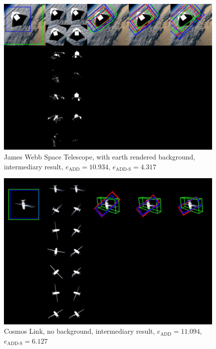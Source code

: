 \begin{figure}[ht]
  \centering
  \includegraphics[width=\textwidth]{data/fig12.jpg}
  \caption{James Webb Space Telescope, with earth rendered background, intermediary result, $e_\mathrm{ADD}=10.934$, $e_{\mathrm{ADD}\text{-}\mathrm{S}}=4.317$}
  \label{fig:cap1}
\end{figure}

\begin{figure}[ht]
  \centering
  \includegraphics[width=\textwidth]{data/fig13.jpg}
  \caption{Cosmos Link, no background, intermediary result, $e_\mathrm{ADD}=11.094$, $e_{\mathrm{ADD}\text{-}\mathrm{S}}=6.127$}
  \label{fig:cap1}
\end{figure}

